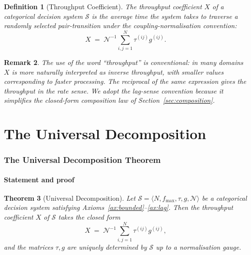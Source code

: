 \documentclass[twocolumn,11pt,a4paper]{article}
\newtheorem{theorem}{Theorem}[section]
\newtheorem{definition}[theorem]{Definition}
\newtheorem{remark}[theorem]{Remark}
\newcommand{\TP}{X}
\newcommand{\Norm}{\mathcal{N}}
\newcommand{\lag}{\tau}
\newcommand{\cpl}{g}
\newcommand{\Sys}{\mathcal{S}}
\newcommand{\classcount}{N}
\begin{document}
\begin{definition}[Throughput Coefficient]
\label{def:throughput}
The \emph{throughput coefficient} $\TP$ of a categorical decision system $\Sys$ is the average time the system takes to traverse a randomly selected pair-transition under the coupling-normalisation convention:
\[
\TP \;=\; \Norm^{-1} \sum_{i,j=1}^{\classcount} \lag^{(ij)} \cpl^{(ij)}.
\]
\end{definition}

\begin{remark}
The use of the word ``throughput'' is conventional: in many domains $\TP$ is more naturally interpreted as inverse throughput, with smaller values corresponding to faster processing. The reciprocal of the same expression gives the throughput in the rate sense. We adopt the lag-sense convention because it simplifies the closed-form composition law of Section~\ref{sec:composition}.
\end{remark}

\part{The Universal Decomposition}

\section{The Universal Decomposition Theorem}
\label{sec:universal}

\subsection{Statement and proof}

\begin{theorem}[Universal Decomposition]
\label{thm:universal-decomposition}
Let $\Sys = \langle \classcount, f_{\max}, \lag, \cpl, \Norm \rangle$ be a categorical decision system satisfying Axioms~\ref{ax:bounded}--\ref{ax:lag}. Then the throughput coefficient $\TP$ of $\Sys$ takes the closed form
\begin{equation}
\TP \;=\; \Norm^{-1} \sum_{i,j=1}^{\classcount} \lag^{(ij)} \cpl^{(ij)},
\label{eq:utl-main}
\end{equation}
and the matrices $\lag, \cpl$ are uniquely determined by $\Sys$ up to a normalisation gauge.
\end{theorem}
\end{document}
